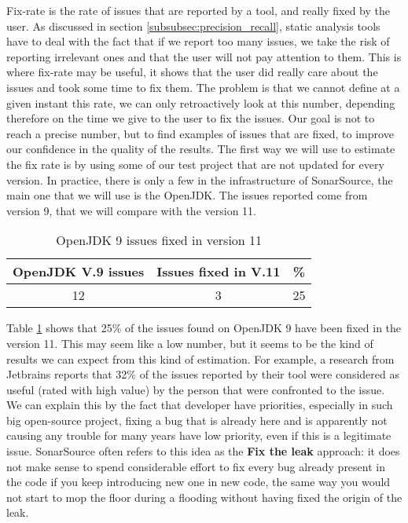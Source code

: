 Fix-rate is the rate of issues that are reported by a tool, and really fixed by the user. 
As discussed in section \ref{subsubsec:precision_recall}, static analysis tools have to deal with the fact that if we report too many issues, we take the risk of reporting irrelevant ones and that the user will not pay attention to them. 
This is where fix-rate may be useful, it shows that the user did really care about the issues and took some time to fix them. \newline
The problem is that we cannot define at a given instant this rate, we can only retroactively look at this number, depending therefore on the time we give to the user to fix the issues.
Our goal is not to reach a precise number, but to find examples of issues that are fixed, to improve our confidence in the quality of the results.\newline
The first way we will use to estimate the fix rate is by using some of our test project that are not updated for every version.
In practice, there is only a few in the infrastructure of SonarSource, the main one that we will use is the OpenJDK.
The issues reported come from version 9, that we will compare with the version 11.

\begin{table}[h]
	\centering
	\caption{OpenJDK 9 issues fixed in version 11}
	\label{table:openJDK_issues}
	\begin{tabular}{|c|c|c|}
		\hline
		\bf OpenJDK V.9  issues & \bf Issues fixed in V.11 & \bf \% \\ \hline
		12 &  3 &  25 \\ \hline
	\end{tabular}
\end{table}

Table \ref{table:openJDK_issues} shows that 25\% of the issues found on OpenJDK 9 have been fixed in the version 11. 
This may seem like a low number, but it seems to be the kind of results we can expect from this kind of estimation.
For example, a research from Jetbrains \cite{Bryksin:2018:DAK:3236454.3236457} reports that 32\% of the issues reported by their tool were considered as useful (rated with high value) by the person that were confronted to the issue. 
We can explain this by the fact that developer have priorities, especially in such big open-source project, fixing a bug that is already here and is apparently not causing any trouble for many years have low priority, even if this is a legitimate issue. 
SonarSource often refers to this idea as the \textbf{Fix the leak} approach: it does not make sense to spend considerable effort to fix every bug already present in the code if you keep introducing new one in new code, the same way you would not start to mop the floor during a flooding without having fixed the origin of the leak.

